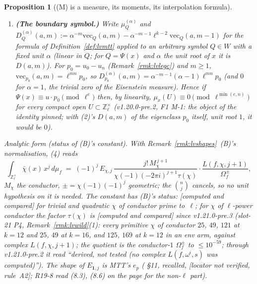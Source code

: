 \documentclass[11pt]{article}
\newtheorem{proposition}[theorem]{Proposition}
\theoremstyle{remark}
\newcommand{\Z}{\mathbb{Z}}
\newcommand{\CMPD}{\textsf{[computed and compared]}}   %
\newcommand{\VERIFYloc}{\textsf{[locator not verified, rule~A2]}} %
\begin{document}
\begin{proposition}[(M) is a measure, its moments, its interpolation formula]
\begin{enumerate}
  are read at level~$M$, the $T^{t}$-coefficients for $t<\ell$ modulo $\ell^{M-1}$.
\item \textbf{(The boundary symbol.)} Write $\mu^{(\alpha)}_{Q}$ and $D^{(\alpha)}_{Q}(a,m):=\alpha^{-m}\mathrm{vec}_Q(a,m)-\alpha^{-m-1}\ell^{k-2}\mathrm{vec}_Q(a,m-1)$ for the formula of
  Definition~\ref{def:lvmtt} applied to an arbitrary symbol $Q\in W$ with a fixed unit $\alpha$ (linear in $Q$; for $Q=\Psi(x)$ and $\alpha$ the unit root of $x$ it is $D(a,m)$). For
  $p_0=u_0-u_n$ (Remark~\ref{rmk:lvlegc}) and $m\ge1$, $\mathrm{vec}_{p_0}(a,m)=\ell^{mn}p_0$, so $D^{(\alpha)}_{p_0}(a,m)=\alpha^{-m-1}(\alpha-1)\ell^{mn}p_0$ (and $0$ for $\alpha=1$, the
  trivial zero of the Eisenstein measure). Hence if $\Psi(x)\equiv u\cdot p_0\pmod{\ell^{e}}$ then, by linearity, $\mu_x(U)\equiv0\pmod{\ell^{\min(e,n)}}$ for every compact open
  $U\subset\Z_\ell^{\times}$ (v1.20.0-pre.2, F1 M-1: the object of the identity pinned; with (2)'s $D(a,m)$ of the eigenclass $p_0$ itself, unit root $1$, it would be $0$).
\end{enumerate}
\emph{Analytic form} (status of (B)'s constant). With Remark~\ref{rmk:lvshapes}~(B)'s normalisation, (4) reads
\[
  \int_{\Z_\ell^{\times}}\bar\chi(x)\,x^{j}\,d\mu_f\;=\;(-1)^{j}\,E_{\chi,j}\,\frac{j!\,M_\chi^{\,j+1}}{\chi(-1)(-2\pi i)^{j+1}\tau(\chi)}\cdot\frac{L(f,\chi,j+1)}{\Omega_f^{\pm}},
\]
$M_\chi$ the conductor, $\pm=\chi(-1)(-1)^{j}$ geometric; the $\binom nj$ cancels, so no unit hypothesis on it is needed. The constant has (B)'s status: \CMPD{} for trivial and quadratic $\chi$
of conductor prime to~$\ell$; for $\chi$ of $\ell$-power conductor the factor $\tau(\chi)$ is \CMPD{} since v1.21.0-pre.3 (slot-21 P4, Remark~\ref{rmk:lvwild}(1): every primitive $\chi$ of conductor
$25$, $49$, $121$ at $k=12$ and $25$, $49$ at $k=16$, and $125$, $169$ at $k=12$ in an env arm, against complex $L(f,\chi,j+1)$; the quotient is the conductor-$1$ $\Omega_f^{\pm}$ to $\le10^{-59}$; through
v1.21.0-pre.2 it read ``\emph{derived, not tested} (no complex $L(f,\omega^{i},s)$ was computed)''). The shape of
$E_{\mathbf 1,j}$ is MTT's $e_p$ (\cite{mtt} \S11, recalled, \VERIFYloc; R19-8 read (8.3), (8.6) on the page for the non-$\ell$ part).
\end{proposition}
\end{document}
